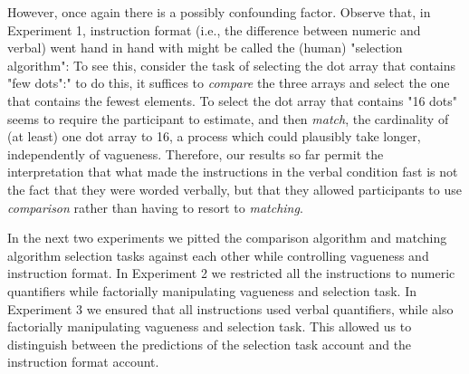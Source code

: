 However, once again there is a possibly confounding factor. Observe that, in Experiment 1, instruction format (i.e., the difference between numeric and verbal) went hand in hand with might be called the (human) "selection algorithm": To see this, consider the task of selecting the dot array that contains "few dots":" to do this, it suffices to \emph{compare} the three arrays and select the one that contains the fewest elements.  To select the dot array that contains "16 dots" seems to require the participant to estimate, and then \emph{match}, the cardinality of (at least) one dot array to 16, a process which could plausibly take longer, independently of vagueness. Therefore, our results so far permit the interpretation that what made the instructions in the verbal condition fast is not the fact that they were worded verbally, but that they allowed participants to use \emph{comparison} rather than having to resort to \emph{matching}.

In the next two experiments we pitted the comparison algorithm and matching algorithm selection tasks against each other while controlling vagueness and instruction format. In Experiment 2 we restricted all the instructions to numeric quantifiers while factorially manipulating vagueness and selection task. In Experiment 3 we ensured that all instructions used verbal quantifiers, while also factorially manipulating vagueness and selection task. This allowed us to distinguish between the predictions of the selection task account and the instruction format account. 

